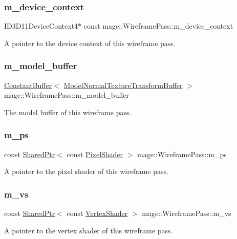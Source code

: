 \subsubsection{\texorpdfstring{m\+\_\+device\+\_\+context}{m\_device\_context}}
{\footnotesize\ttfamily I\+D3\+D11\+Device\+Context4$\ast$ const mage\+::\+Wireframe\+Pass\+::m\+\_\+device\+\_\+context\hspace{0.3cm}{\ttfamily [private]}}

A pointer to the device context of this wireframe pass. \hypertarget{classmage_1_1_wireframe_pass_aa7fb7cbba08fe8b4d7defab36d2e82a7}{}\label{classmage_1_1_wireframe_pass_aa7fb7cbba08fe8b4d7defab36d2e82a7} 
\subsubsection{\texorpdfstring{m\+\_\+model\+\_\+buffer}{m\_model\_buffer}}
{\footnotesize\ttfamily \hyperlink{structmage_1_1_constant_buffer}{Constant\+Buffer}$<$ \hyperlink{structmage_1_1_model_normal_texture_transform_buffer}{Model\+Normal\+Texture\+Transform\+Buffer} $>$ mage\+::\+Wireframe\+Pass\+::m\+\_\+model\+\_\+buffer\hspace{0.3cm}{\ttfamily [private]}}

The model buffer of this wireframe pass. \hypertarget{classmage_1_1_wireframe_pass_a39577f12ad9b3f72e703c290cbf46002}{}\label{classmage_1_1_wireframe_pass_a39577f12ad9b3f72e703c290cbf46002} 
\subsubsection{\texorpdfstring{m\+\_\+ps}{m\_ps}}
{\footnotesize\ttfamily const \hyperlink{namespacemage_a1e01ae66713838a7a67d30e44c67703e}{Shared\+Ptr}$<$ const \hyperlink{namespacemage_a27ecaf266420ee7a494d64edc0757129}{Pixel\+Shader} $>$ mage\+::\+Wireframe\+Pass\+::m\+\_\+ps\hspace{0.3cm}{\ttfamily [private]}}

A pointer to the pixel shader of this wireframe pass. \hypertarget{classmage_1_1_wireframe_pass_aa55de3b804055362812bcf775e0dffb4}{}\label{classmage_1_1_wireframe_pass_aa55de3b804055362812bcf775e0dffb4} 
\subsubsection{\texorpdfstring{m\+\_\+vs}{m\_vs}}
{\footnotesize\ttfamily const \hyperlink{namespacemage_a1e01ae66713838a7a67d30e44c67703e}{Shared\+Ptr}$<$ const \hyperlink{classmage_1_1_vertex_shader}{Vertex\+Shader} $>$ mage\+::\+Wireframe\+Pass\+::m\+\_\+vs\hspace{0.3cm}{\ttfamily [private]}}

A pointer to the vertex shader of this wireframe pass. 